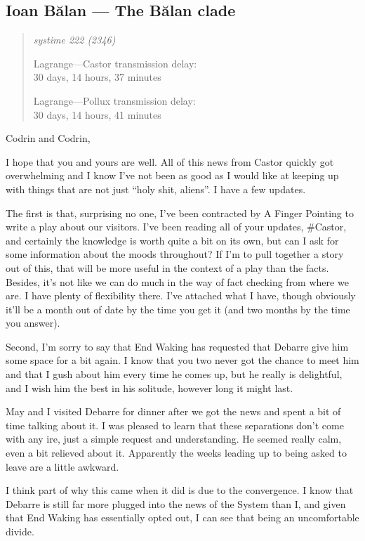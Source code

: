 \hypertarget{ioan-bux103lan-the-bux103lan-clade}{%
\subsection{Ioan Bălan — The Bălan clade}\label{ioan-bux103lan-the-bux103lan-clade}}

\begin{quote}
\itshape
systime 222 (2346)

Lagrange---Castor transmission delay:\\
30 days, 14 hours, 37 minutes

Lagrange---Pollux transmission delay:\\
30 days, 14 hours, 41 minutes
\end{quote}

Codrin and Codrin,

I hope that you and yours are well. All of this news from Castor quickly got overwhelming and I know I've not been as good as I would like at keeping up with things that are not just ``holy shit, aliens''. I have a few updates.

The first is that, surprising no one, I've been contracted by A Finger Pointing to write a play about our visitors. I've been reading all of your updates, \#Castor, and certainly the knowledge is worth quite a bit on its own, but can I ask for some information about the moods throughout? If I'm to pull together a story out of this, that will be more useful in the context of a play than the facts. Besides, it's not like we can do much in the way of fact checking from where we are. I have plenty of flexibility there. I've attached what I have, though obviously it'll be a month out of date by the time you get it (and two months by the time you answer).

Second, I'm sorry to say that End Waking has requested that Debarre give him some space for a bit again. I know that you two never got the chance to meet him and that I gush about him every time he comes up, but he really is delightful, and I wish him the best in his solitude, however long it might last.

May and I visited Debarre for dinner after we got the news and spent a bit of time talking about it. I was pleased to learn that these separations don't come with any ire, just a simple request and understanding. He seemed really calm, even a bit relieved about it. Apparently the weeks leading up to being asked to leave are a little awkward.

I think part of why this came when it did is due to the convergence. I know that Debarre is still far more plugged into the news of the System than I, and given that End Waking has essentially opted out, I can see that being an uncomfortable divide.

